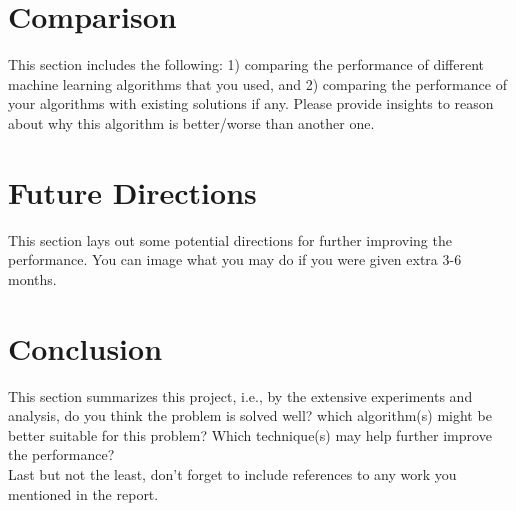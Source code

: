 \documentclass[conference]{IEEEtran}
\begin{document}
\section{Comparison}  
This section includes the following: 1) comparing the performance of different machine learning algorithms that you used, and 2) comparing the performance of your algorithms with existing solutions if any. Please provide insights to reason about why this algorithm is better/worse than another one.

\section{Future Directions}
This section lays out some potential directions for further improving the performance. You can image what you may do if you were given extra 3-6 months.

\section{Conclusion}
This section summarizes this project, i.e., by the extensive experiments and analysis, do you think the problem is solved well? which algorithm(s) might be better suitable for this problem? Which technique(s) may help further improve the performance? \\

Last but not the least, don't forget to include references to any work you mentioned in the report.

\newpage



\end{document}

